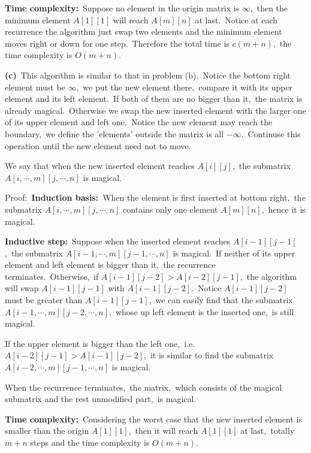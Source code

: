 \documentclass[]{article}
\begin{document}
	\textbf{Time complexity:}\ Suppose no element in the origin matrix is $\infty$,\ then the minimum element $A[1][1]$ will reach $A[m][n]$ at last.\ Notice at each recurrence the algorithm just swap two elements and the minimum element moves right or down for one step.\ Therefore the total time is $c(m+n)$,\ the time complexity is $O(m+n)$. 
	
	\textbf{(c)}\ This algorithm is similar to that in problem (b).\ Notice the bottom right element must be $\infty$,\ we put the new element there,\ compare it with its upper element and its left element.\ If both of them are no bigger than it,\ the matrix is already magical.\ Otherwise we swap the new inserted element with the larger one of its upper element and left one.\ Notice the new element may reach the boundary,\ we define the 'elements' outside the matrix is all $-\infty$.\ Continuse this operation until the new element need not to move.
	
	We say that when the new inserted element reaches $A[i][j]$,\ the submatrix $A[i, \cdots, m][j, \cdots, n]$ is magical.
	
	Proof:\ \textbf{Induction basis:}\ When the element is first inserted at bottom right,\ the submatrix $A[i, \cdots, m][j, \cdots, n]$ contains only one element $A[m][n]$,\ hence it is magical.
	
	\textbf{Inductive step:}\ Suppose when the inserted element reaches $A[i-1][j-1]$,\ the submatrix $A[i-1, \cdots, m][j-1, \cdots, n]$ is magical.\ If neither of its upper element and left element is bigger than it,\ the recurrence terminates.\ Otherwise,\ if $A[i-1][j-2] > A[i-2][j-1]$,\ the algorithm will swap $A[i-1][j-1]$ with $A[i-1][j-2]$.\ Notice $A[i-1][j-2]$ must be greater than $A[i-1][j-1]$,\ we can easily find that the submatrix $A[i-1, \cdots, m][j-2, \cdots, n]$,\ whose up left element is the inserted one,\ is still magical.
	
	If the upper element is bigger than the left one,\ i.e.\ $A[i-2][j-1] > A[i-1][j-2]$,\ it is similar to find the submatrix $A[i-2, \cdots, m][j-1, \cdots, n]$ is magical.
	
	When the recurrence terminates,\ the matrix,\ which consists of the magical submatrix and the rest unmodified part,\ is magical.
	
	\textbf{Time complexity:}\ Considering the worst case that the new inserted element is smaller than the origin $A[1][1]$,\ then it will reach $A[1][1]$ at last,\ totally $m+n$ steps and the time complexity is $O(m+n)$. 
	
\end{document}
